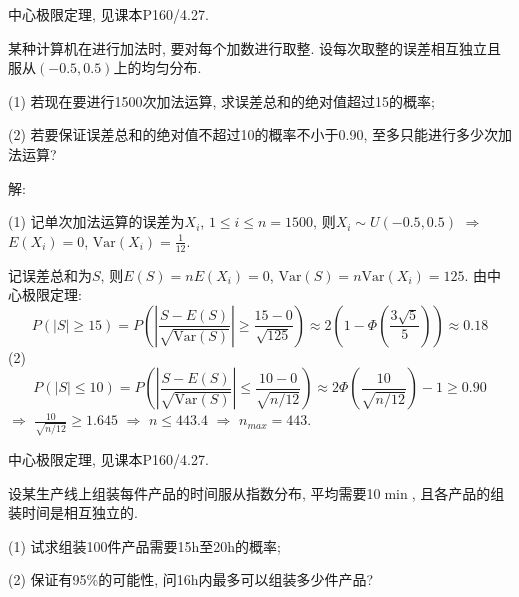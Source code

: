 \documentclass[standard]{ExBook}
\begin{document}
\begin{qitems}
\begin{bbox}
\textcolor{themeColor}{\selectfont {} 中心极限定理, 见课本P160/4.27.}
    \end{bbox}

\vspace{-5em}

    \begin{bbox}
    \begin{shaded}
        \qitem
某种计算机在进行加法时, 要对每个加数进行取整. 设每次取整的误差相互独立且服从$(-0.5,0.5)$上的均匀分布.

(1) 若现在要进行1500次加法运算, 求误差总和的绝对值超过15的概率;

(2) 若要保证误差总和的绝对值不超过10的概率不小于0.90, 至多只能进行多少次加法运算?
    \end{shaded}
    \end{bbox}

\vspace{-5em}

    \begin{bbox}
解: 

(1) 记单次加法运算的误差为$X_i$, $1\leq i\leq n=1500$, 则$X_i\sim U(-0.5,0.5)$ $\Longrightarrow$ $E(X_i)=0$, $\mathrm{Var}(X_i)=\displaystyle\frac{1}{12}$.

记误差总和为$S$, 则$E(S)=nE(X_i)=0$, $\mathrm{Var}(S)=n\mathrm{Var}(X_i)=125$. 由中心极限定理:
$$\displaystyle P(|S|\geq 15)=P\left(\left|\frac{S-E(S)}{\sqrt{\mathrm{Var}(S)}}\right| \geq \frac{15-0}{\sqrt{125}}\right) \approx 2\left(1-\Phi\left(\frac{3\sqrt{5}}{5}\right)\right) \approx 0.18$$
(2) $$\displaystyle P(|S|\leq 10)=P\left(\left|\frac{S-E(S)}{\sqrt{\mathrm{Var}(S)}}\right| \leq \frac{10-0}{\sqrt{n/12}}\right) \approx 2\Phi\left(\frac{10}{\sqrt{n/12}}\right)-1 \geq 0.90$$
$\Longrightarrow$ $\displaystyle\frac{10}{\sqrt{n/12}} \geq 1.645$ $\Longrightarrow$ $n\leq 443.4$ $\Longrightarrow$ $n_{max}=443$.

\textcolor{themeColor}{\selectfont {} 中心极限定理, 见课本P160/4.27.}
    \end{bbox}

\vspace{-5em}

    \begin{bbox}
    \begin{shaded}
        \qitem
设某生产线上组装每件产品的时间服从指数分布, 平均需要10$\min$, 且各产品的组装时间是相互独立的.

(1) 试求组装100件产品需要15h至20h的概率;

(2) 保证有95\%的可能性, 问16h内最多可以组装多少件产品?
    \end{shaded}
    \end{bbox}


\end{qitems}
\end{document}
